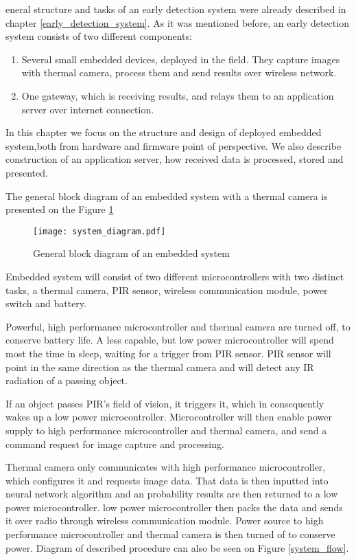 eneral structure and tasks of an early detection system were already described in chapter \ref{early_detection_system}.
As it was mentioned before, an early detection system consists of two different components:

\begin{enumerate} 
    \item Several small embedded devices, deployed in the field. 
        They capture images with thermal camera, process them and send results over wireless network.
    \item One gateway, which is receiving results, and relays them to an application server over internet connection.
\end{enumerate} 

In this chapter we focus on the structure and design of deployed embedded system,both from hardware and firmware point of perspective.
We also describe construction of an application server, how received data is processed, stored and presented.

The general block diagram of an embedded system with a thermal camera is presented on the Figure \ref{system_diagram} 

\begin{figure}[ht]
        \centering
        \texttt{[image: system\_diagram.pdf]} 
        \caption{ General block diagram of an embedded system}
        \label{system_diagram}
\end{figure}

Embedded system will consist of two different microcontrollers with two distinct tasks, a thermal camera, PIR sensor, wireless communication module, power switch and battery.

Powerful, high performance microcontroller and thermal camera are turned off, to conserve battery life.
A less capable, but low power microcontroller will spend most the time in sleep, waiting for a trigger from PIR sensor.
PIR sensor will point in the same direction as the thermal camera and will detect any IR radiation of a passing object.

If an object passes PIR's field of vision, it triggers it, which in consequently wakes up a low power microcontroller.
Microcontroller will then enable power supply to high performance microcontroller and thermal camera, and send a command request for image capture and processing.

Thermal camera only communicates with high performance microcontroller, which configures it and requests image data.
That data is then inputted into neural network algorithm and an probability results are then returned to a low power microcontroller.
low power microcontroller then packs the data and sends it over radio through wireless communication module.
Power source to high performance microcontroller and thermal camera is then turned of to conserve power.
Diagram of described procedure can also be seen on Figure \ref{system_flow}.

